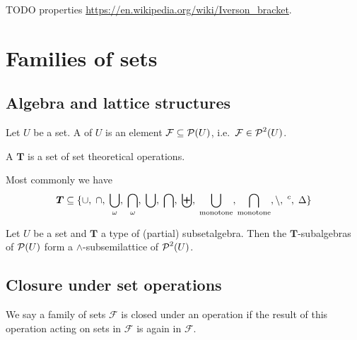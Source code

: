 TODO properties \url{https://en.wikipedia.org/wiki/Iverson_bracket}.

\section{Families of sets}
\subsection{Algebra and lattice structures}
\begin{definition}
Let $U$ be a set. A  of $U$ is an element $\mathcal{F}\subseteq\operatorname{\mathcal{P}}(U)$, i.e.\ $\mathcal{F}\in\operatorname{\mathcal{P}}^2(U)$.

A  $\boldsymbol{T}$ is a set of set theoretical operations.
\end{definition}
Most commonly we have
\[ \boldsymbol{T} \subseteq \{\cup,\; \cap,\; \bigcup_\omega,\; \bigcap_\omega,\; \bigcup,\; \bigcap,\; \biguplus,\; \bigcup_\text{monotone}, \bigcap_\text{monotone}, \setminus,\; ^c,\; \mathbin{\Delta} \} \]

\begin{proposition}
Let $U$ be a set and $\boldsymbol{T}$ a type of (partial) subsetalgebra. Then the $\boldsymbol{T}$-subalgebras of $\operatorname{\mathcal{P}}(U)$ form a $\wedge$-subsemilattice of $\operatorname{\mathcal{P}}^2(U)$.
\end{proposition}

\subsection{Closure under set operations}
We say a family of sets $\mathcal{F}$ is closed under an operation if the result of this operation acting on sets in $\mathcal{F}$ is again in $\mathcal{F}$.

